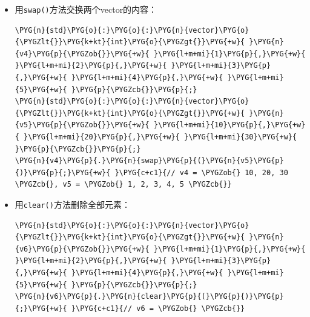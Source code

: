 \begin{itemize}

\item 用\texttt{swap()}方法交换两个vector的内容：



\begin{codeblockbg}
\begin{Verbatim}[commandchars=\\\{\},breaklines=true,breakanywhere=true,fontsize=\codefont,xleftmargin=17bp]
\PYG{n}{std}\PYG{o}{:}\PYG{o}{:}\PYG{n}{vector}\PYG{o}{\PYGZlt{}}\PYG{k+kt}{int}\PYG{o}{\PYGZgt{}}\PYG{+w}{ }\PYG{n}{v4}\PYG{p}{\PYGZob{}}\PYG{+w}{ }\PYG{l+m+mi}{1}\PYG{p}{,}\PYG{+w}{ }\PYG{l+m+mi}{2}\PYG{p}{,}\PYG{+w}{ }\PYG{l+m+mi}{3}\PYG{p}{,}\PYG{+w}{ }\PYG{l+m+mi}{4}\PYG{p}{,}\PYG{+w}{ }\PYG{l+m+mi}{5}\PYG{+w}{ }\PYG{p}{\PYGZcb{}}\PYG{p}{;}
\PYG{n}{std}\PYG{o}{:}\PYG{o}{:}\PYG{n}{vector}\PYG{o}{\PYGZlt{}}\PYG{k+kt}{int}\PYG{o}{\PYGZgt{}}\PYG{+w}{ }\PYG{n}{v5}\PYG{p}{\PYGZob{}}\PYG{+w}{ }\PYG{l+m+mi}{10}\PYG{p}{,}\PYG{+w}{ }\PYG{l+m+mi}{20}\PYG{p}{,}\PYG{+w}{ }\PYG{l+m+mi}{30}\PYG{+w}{ }\PYG{p}{\PYGZcb{}}\PYG{p}{;}
\PYG{n}{v4}\PYG{p}{.}\PYG{n}{swap}\PYG{p}{(}\PYG{n}{v5}\PYG{p}{)}\PYG{p}{;}\PYG{+w}{ }\PYG{c+c1}{// v4 = \PYGZob{} 10, 20, 30 \PYGZcb{}, v5 = \PYGZob{} 1, 2, 3, 4, 5 \PYGZcb{}}
\end{Verbatim}
\end{codeblockbg}



\item 用\texttt{clear()}方法删除全部元素：



\begin{codeblockbg}
\begin{Verbatim}[commandchars=\\\{\},breaklines=true,breakanywhere=true,fontsize=\codefont,xleftmargin=17bp]
\PYG{n}{std}\PYG{o}{:}\PYG{o}{:}\PYG{n}{vector}\PYG{o}{\PYGZlt{}}\PYG{k+kt}{int}\PYG{o}{\PYGZgt{}}\PYG{+w}{ }\PYG{n}{v6}\PYG{p}{\PYGZob{}}\PYG{+w}{ }\PYG{l+m+mi}{1}\PYG{p}{,}\PYG{+w}{ }\PYG{l+m+mi}{2}\PYG{p}{,}\PYG{+w}{ }\PYG{l+m+mi}{3}\PYG{p}{,}\PYG{+w}{ }\PYG{l+m+mi}{4}\PYG{p}{,}\PYG{+w}{ }\PYG{l+m+mi}{5}\PYG{+w}{ }\PYG{p}{\PYGZcb{}}\PYG{p}{;}
\PYG{n}{v6}\PYG{p}{.}\PYG{n}{clear}\PYG{p}{(}\PYG{p}{)}\PYG{p}{;}\PYG{+w}{ }\PYG{c+c1}{// v6 = \PYGZob{} \PYGZcb{}}
\end{Verbatim}
\end{codeblockbg}




\end{itemize}
